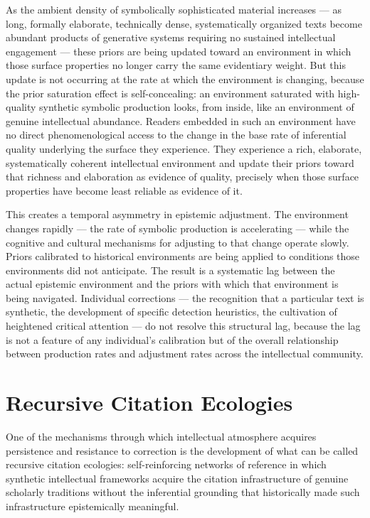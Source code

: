 \documentclass[12pt, openright, twoside]{book}
\begin{document}
As the ambient density of symbolically sophisticated material
increases --- as long, formally elaborate, technically dense,
systematically organized texts become abundant products of
generative systems requiring no sustained intellectual engagement
--- these priors are being updated toward an environment in which
those surface properties no longer carry the same evidentiary weight.
But this update is not occurring at the rate at which the environment
is changing, because the prior saturation effect is self-concealing:
an environment saturated with high-quality synthetic symbolic
production looks, from inside, like an environment of genuine
intellectual abundance. Readers embedded in such an environment
have no direct phenomenological access to the change in the base
rate of inferential quality underlying the surface they experience.
They experience a rich, elaborate, systematically coherent intellectual
environment and update their priors toward that richness and
elaboration as evidence of quality, precisely when those surface
properties have become least reliable as evidence of it.

This creates a temporal asymmetry in epistemic adjustment. The
environment changes rapidly --- the rate of symbolic production
is accelerating --- while the cognitive and cultural mechanisms
for adjusting to that change operate slowly. Priors calibrated to
historical environments are being applied to conditions those
environments did not anticipate. The result is a systematic lag
between the actual epistemic environment and the priors with which
that environment is being navigated. Individual corrections --- the
recognition that a particular text is synthetic, the development
of specific detection heuristics, the cultivation of heightened
critical attention --- do not resolve this structural lag, because
the lag is not a feature of any individual's calibration but of
the overall relationship between production rates and adjustment
rates across the intellectual community.

\section{Recursive Citation Ecologies}

One of the mechanisms through which intellectual atmosphere acquires
persistence and resistance to correction is the development of what
can be called recursive citation ecologies: self-reinforcing networks
of reference in which synthetic intellectual frameworks acquire the
citation infrastructure of genuine scholarly traditions without the
inferential grounding that historically made such infrastructure
epistemically meaningful.
\end{document}
